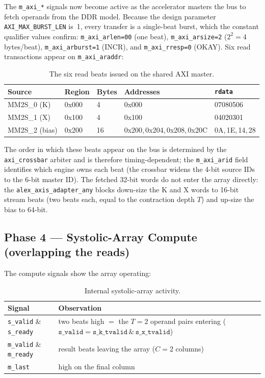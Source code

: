 The \texttt{m\_axi\_*} signals now become active as the accelerator masters the
bus to fetch operands from the DDR model. Because the design parameter
\texttt{AXI\_MAX\_BURST\_LEN} is~1, every transfer is a single-beat burst, which
the constant qualifier values confirm: \texttt{m\_axi\_arlen=00} (one beat),
\texttt{m\_axi\_arsize=2} ($2^2 = 4$ bytes/beat), \texttt{m\_axi\_arburst=1}
(INCR), and \texttt{m\_axi\_rresp=0} (OKAY). Six read transactions appear on
\texttt{m\_axi\_araddr}:

\begin{table}[h]
\centering
\begin{tabular}{lllll}
\toprule
Source & Region & Bytes & Addresses & \texttt{rdata} \\
\midrule
MM2S\_0 (K)    & 0x000 & 4  & 0x000 & 07080506 \\
MM2S\_1 (X)    & 0x100 & 4  & 0x100 & 04020301 \\
MM2S\_2 (bias) & 0x200 & 16 & 0x200,\,0x204,\,0x208,\,0x20C & 0A,\,1E,\,14,\,28 \\
\bottomrule
\end{tabular}
\caption{The six read beats issued on the shared AXI master.}
\label{tab:reads}
\end{table}

The order in which these beats appear on the bus is determined by the
\texttt{axi\_crossbar} arbiter and is therefore timing-dependent; the
\texttt{m\_axi\_arid} field identifies which engine owns each beat (the crossbar
widens the 4-bit source IDs to the 6-bit master ID). The fetched 32-bit words do
not enter the array directly: the \texttt{alex\_axis\_adapter\_any} blocks
down-size the K and X words to 16-bit stream beats (two beats each, equal to the
contraction depth $T$) and up-size the bias to 64-bit.

\subsection{Phase 4 --- Systolic-Array Compute (overlapping the reads)}

The compute signals show the array operating:

\begin{table}[h]
\centering
\begin{tabular}{ll}
\toprule
Signal & Observation \\
\midrule
\texttt{s\_valid} \& \texttt{s\_ready} & two beats high $=$ the $T{=}2$ operand pairs entering ($\texttt{s\_valid}=\texttt{s\_k\_tvalid}\,\&\,\texttt{s\_x\_tvalid}$) \\
\texttt{m\_valid} \& \texttt{m\_ready} & result beats leaving the array ($C{=}2$ columns) \\
\texttt{m\_last} & high on the final column \\
\bottomrule
\end{tabular}
\caption{Internal systolic-array activity.}
\label{tab:compute}
\end{table}

